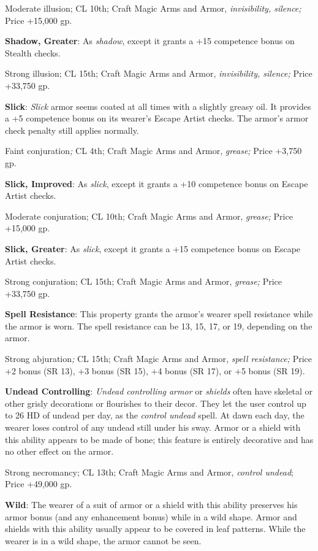 Moderate illusion; CL 10th; Craft Magic Arms and Armor, \textit{invisibility, silence; }Price +15,000 gp.
				
\textbf{Shadow, Greater}: As \textit{shadow}, except it grants a +15 competence bonus on Stealth checks.
				
Strong illusion; CL 15th; Craft Magic Arms and Armor, \textit{invisibility, silence; }Price +33,750 gp.
				
\textbf{Slick}: \textit{Slick} armor seems coated at all times with a slightly greasy oil. It provides a +5 competence bonus on its wearer's Escape Artist checks. The armor's armor check penalty still applies normally.
				
Faint conjuration\textit{; }CL 4th; Craft Magic Arms and Armor, \textit{grease; }Price +3,750 gp.
				
\textbf{Slick, Improved}: As \textit{slick}, except it grants a +10 competence bonus on Escape Artist checks.
				
Moderate conjuration; CL 10th; Craft Magic Arms and Armor, \textit{grease; }Price +15,000 gp.
				
\textbf{Slick, Greater}: As \textit{slick}, except it grants a +15 competence bonus on Escape Artist checks.
				
Strong conjuration; CL 15th; Craft Magic Arms and Armor, \textit{grease; }Price +33,750 gp.
				
\textbf{Spell Resistance}: This property grants the armor's wearer spell resistance while the armor is worn. The spell resistance can be 13, 15, 17, or 19, depending on the armor.
				
Strong abjuration\textit{; }CL 15th; Craft Magic Arms and Armor, \textit{spell resistance; }Price +2 bonus (SR 13), +3 bonus (SR 15), +4 bonus (SR 17), or +5 bonus (SR 19).
				
\textbf{Undead Controlling}: \textit{Undead controlling armor} or \textit{shields} often have skeletal or other grisly decorations or flourishes to their decor. They let the user control up to 26 HD of undead per day, as the \textit{control undead }spell. At dawn each day, the wearer loses control of any undead still under his sway. Armor or a shield with this ability appears to be made of bone; this feature is entirely decorative and has no other effect on the armor.
				
Strong necromancy; CL 13th; Craft Magic Arms and Armor, \textit{control undead}; Price +49,000 gp.
				
\textbf{Wild}: The wearer of a suit of armor or a shield with this ability preserves his armor bonus (and any enhancement bonus) while in a wild shape. Armor and shields with this ability usually appear to be covered in leaf patterns. While the wearer is in a wild shape, the armor cannot be seen.
				
